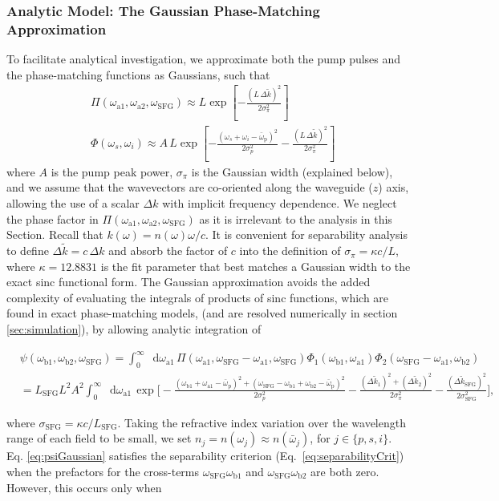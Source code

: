 \documentclass[twocolumn,amssymb, nobibnotes, showpacs, aps, pra,10pt]{revtex4-1}
\newcommand*{\wi}{\omega_{i}}
\newcommand*{\ws}{\omega_{s}}
\newcommand*{\wpbar}{\bar{\omega}_{\text{p}}}
\newcommand*{\waone}{\omega_{\textrm{a}1}}
\newcommand*{\watwo}{\omega_{\textrm{a}2}}
\newcommand*{\wbone}{\omega_{\textrm{b}1}}
\newcommand*{\wbtwo}{\omega_{\textrm{b}2}}
\newcommand*{\wsfg}{\omega_\textrm{SFG}}
\newcommand*\diff{\mathop{}\!\mathrm{d}}
\begin{document}
\subsubsection{Analytic Model: The Gaussian Phase-Matching Approximation}
To facilitate analytical investigation, we approximate both the pump pulses and the phase-matching functions as Gaussians, such that
\begin{align}
&\Pi(\waone, \watwo, \wsfg) \approx L \exp \left[- \frac{(L \, \Delta \widetilde{k} )^2 }{2 \sigma_\pi^2}\right] \label{eq:GaussPM} \\
&\Phi(\ws,\wi) \approx A \, L \exp \left[ -\frac{(\ws + \wi - \wpbar)^2}{2 \sigma_p^2} -\frac{(L \, \Delta \widetilde{k})^2}{2 \sigma_\pi^2} \right] \label{eq:GaussPhi}
\end{align}
where $A$ is the pump peak power, $\sigma_\pi$ is the Gaussian width (explained below), and we assume that the wavevectors are co-oriented along the waveguide ($z$) axis, allowing the use of a scalar $\Delta k$ with implicit frequency dependence. We neglect the phase factor in $\Pi(\waone, \watwo, \wsfg)$ as it is irrelevant to the analysis in this Section. Recall that $k(\omega) = n(\omega) \omega/c$. It is convenient for separability analysis to define $\Delta \widetilde{k} = c\, \Delta k$ and absorb the factor of $c$ into the definition of $\sigma_\pi = \kappa c/L$, where $\kappa=12.8831$ is the fit parameter that best matches a Gaussian width to the exact sinc functional form. The Gaussian approximation avoids the added complexity of evaluating the integrals of products of sinc functions, which are found in exact phase-matching models, (and are resolved numerically in section \ref{sec:simulation}), by allowing analytic integration of
\begin{widetext}
\begin{align} \label{eq:psiGaussian}
&\psi(\wbone,\wbtwo,\wsfg) = \int_0^\infty \diff \waone \, \Pi (\waone, \wsfg - \waone, \wsfg) \Phi_1 (\wbone, \waone) \Phi_2 (\wsfg - \waone, \wbtwo)  \\
&= L_{\text{SFG}} L^2 A^2 \int_0^\infty \diff \waone \, \exp \Big[ -\frac{\left(\wbone +\waone - \wpbar \right)^2+ \left(\wsfg - \wbone +\wbtwo - \wpbar \right)^2}{2 \sigma_p^2} -\frac{\left( \Delta \widetilde{k}_1\right)^2 + \left( \Delta \widetilde{k}_2\right)^2}{2 \sigma_\pi^2} - \frac{\left( \Delta \widetilde{k}_{\text{SFG}} \right)^2}{2 \sigma_{\text{SFG}}^2} \Big], \nonumber
\end{align}
\end{widetext}
where $\sigma_{\text{SFG}} = \kappa c/L_{\text{SFG}}$. Taking the refractive index variation over the wavelength range of each field to be small, we set $n_j = n(\omega_j) \approx n(\bar{\omega}_j)$, for $j \in \{p, s, i\}$. Eq. \eqref{eq:psiGaussian} satisfies the separability criterion (Eq.\ \eqref{eq:separabilityCrit}) when the prefactors for the cross-terms $\wsfg \wbone$ and $\wsfg \wbtwo$ are both zero. However, this occurs only when
\end{document}
